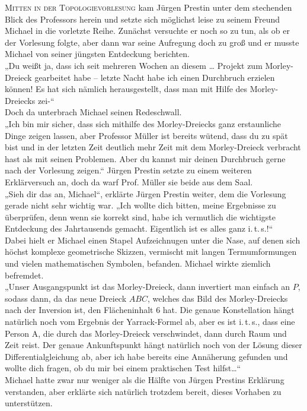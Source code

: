 \documentclass[oneside]{memoir}
\begin{document}
\medskip
\lettrine{M}{itten in der Topologievorlesung} kam Jürgen Prestin unter dem stechenden Blick des Professors herein und setzte sich möglichst leise zu seinem Freund Michael in die vorletzte Reihe. Zunächst versuchte er noch so zu tun, als ob er der Vorlesung folgte, aber dann war seine Aufregung doch zu groß und er musste Michael von seiner jüngsten Entdeckung berichten. \\
 „Du weißt ja, dass ich seit mehreren Wochen an diesem \ldots{} Projekt zum Morley-Dreieck gearbeitet habe -- letzte Nacht habe ich einen Durchbruch erzielen können! Es hat sich nämlich herausgestellt, dass man mit Hilfe des Morley-Dreiecks zei-“  \\
Doch da unterbrach Michael seinen Redeschwall. \\
„Ich bin mir sicher, dass sich mithilfe des Morley-Dreiecks ganz erstaunliche Dinge zeigen lassen, aber Professor Müller ist bereits wütend, dass du zu spät bist und in der letzten Zeit deutlich mehr Zeit mit dem Morley-Dreieck verbracht hast als mit seinen Problemen. Aber du kannst mir deinen Durchbruch gerne nach der Vorlesung zeigen.“ Jürgen Prestin setzte zu einem weiteren Erklärversuch an, doch da warf Prof. Müller sie beide aus dem Saal. \\
„Sieh dir das an, Michael“, erklärte Jürgen Prestin weiter, dem die Vorlesung gerade nicht sehr wichtig war. „Ich wollte dich bitten, meine Ergebnisse zu überprüfen, denn wenn sie korrekt sind, habe ich vermutlich die wichtigste Entdeckung des Jahrtausends gemacht. Eigentlich ist es alles ganz i.\,t.\,s.!“ \\
Dabei hielt er Michael einen Stapel Aufzeichnugen unter die Nase, auf denen sich höchst komplexe geometrische Skizzen, vermischt mit langen Termumformungen und vielen mathematischen Symbolen, befanden. Michael wirkte ziemlich befremdet. \\
„Unser Ausgangspunkt ist das Morley-Dreieck, dann invertiert man einfach an $P$, sodass dann, da das neue Dreieck $ABC$, welches das Bild des Morley-Dreiecks nach der Inversion ist, den Flächeninhalt 6 hat. Die genaue Konstellation hängt natürlich noch vom Ergebnis der Yarrack-Formel ab, aber es ist i.\,t.\,s., dass eine Person A, die durch das Morley-Dreieck verschwindet, dann durch Raum und Zeit reist. Der genaue Ankunftspunkt hängt natürlich noch von der Lösung dieser Differentialgleichung ab, aber ich habe bereits eine Annäherung gefunden und wollte dich fragen, ob du mir bei einem praktischen Test hilfst\ldots“ \\
Michael hatte zwar nur  weniger als die Hälfte von Jürgen Prestins Erklärung verstanden, aber erklärte sich natürlich trotzdem bereit, dieses Vorhaben zu unterstützen.  \\
\end{document}
